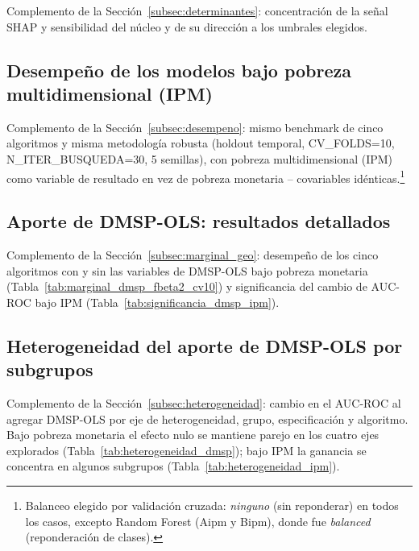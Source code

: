 \documentclass[12pt, letterpaper]{article}
\begin{document}
Complemento de la Sección~\ref{subsec:determinantes}: concentración de la
señal SHAP y sensibilidad del núcleo y de su dirección a los umbrales elegidos.





\subsection{Desempeño de los modelos bajo pobreza multidimensional (IPM)}
\label{apx:desempeno_ipm}

Complemento de la Sección~\ref{subsec:desempeno}: mismo benchmark de
cinco algoritmos y misma metodología robusta (holdout temporal,
CV\_FOLDS=10, N\_ITER\_BUSQUEDA=30, 5 semillas), con pobreza
multidimensional (IPM) como variable de resultado en vez de pobreza
monetaria -- covariables idénticas.\footnote{Balanceo elegido por
validación cruzada: \emph{ninguno} (sin reponderar) en todos los casos,
excepto Random Forest (Aipm y Bipm), donde fue \emph{balanced}
(reponderación de clases).}



\subsection{Aporte de DMSP-OLS: resultados detallados}
\label{apx:marginal_dmsp}

Complemento de la Sección~\ref{subsec:marginal_geo}: desempeño de los
cinco algoritmos con y sin las variables de DMSP-OLS bajo pobreza
monetaria (Tabla~\ref{tab:marginal_dmsp_fbeta2_cv10}) y significancia del
cambio de AUC-ROC bajo IPM (Tabla~\ref{tab:significancia_dmsp_ipm}).





\subsection{Heterogeneidad del aporte de DMSP-OLS por subgrupos}
\label{apx:heterogeneidad_dmsp}

Complemento de la Sección~\ref{subsec:heterogeneidad}: cambio en el
AUC-ROC al agregar DMSP-OLS por eje de heterogeneidad, grupo,
especificación y algoritmo. Bajo pobreza monetaria el efecto nulo se
mantiene parejo en los cuatro ejes explorados
(Tabla~\ref{tab:heterogeneidad_dmsp}); bajo IPM la ganancia se concentra
en algunos subgrupos (Tabla~\ref{tab:heterogeneidad_ipm}).
\end{document}
